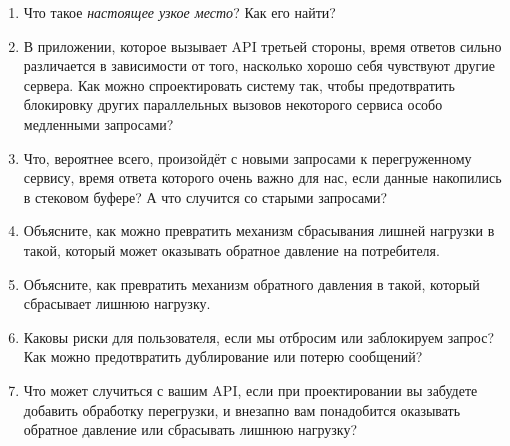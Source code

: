 \begin{enumerate}
	\item Что такое \emph{настоящее узкое место}? Как его найти?
	\item В приложении, которое вызывает API третьей стороны, время ответов сильно различается в зависимости от того, насколько хорошо себя чувствуют другие сервера. Как можно спроектировать систему так, чтобы предотвратить блокировку других параллельных вызовов некоторого сервиса особо медленными запросами?
	\item Что, вероятнее всего, произойдёт с новыми запросами к перегруженному сервису, время ответа которого очень важно для нас, если данные накопились в стековом буфере? А что случится со старыми запросами?
	\item Объясните, как можно превратить механизм сбрасывания лишней нагрузки в такой, который может оказывать обратное давление на потребителя.
	\item Объясните, как превратить механизм обратного давления в такой, который сбрасывает лишнюю нагрузку.
	\item Каковы риски для пользователя, если мы отбросим или заблокируем запрос? Как можно предотвратить дублирование или потерю сообщений?
	\item Что может случиться с вашим API, если при проектировании вы забудете добавить обработку перегрузки, и внезапно вам понадобится оказывать обратное давление или сбрасывать лишнюю нагрузку?
\end{enumerate}



